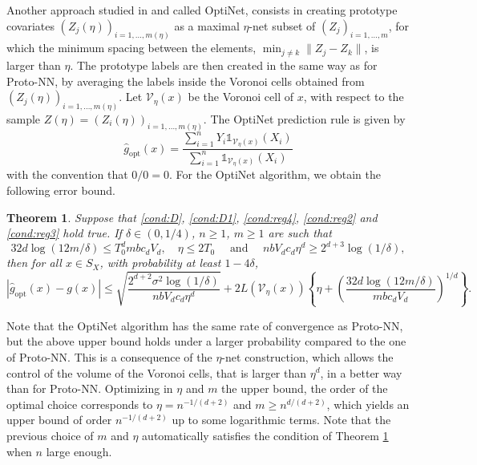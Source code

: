 \documentclass[paper=a4, fontsize=11pt]{scrartcl}
\newcommand{\ind}{\mathds{1}}
\newtheorem{theorem}{Theorem}
\begin{document}
Another approach studied in \cite{NIPS2017_934815ad,hanneke2021universal} and called OptiNet, consists in creating  prototype covariates $(Z_j(\eta))_{i=1,\ldots, m(\eta)} $ as a maximal $\eta$-net  subset of $(Z_j)_{i=1,\ldots, m}$, for which the minimum spacing between the elements, $\min_{j\neq k} \|Z_j- Z_k\|$, is larger than $\eta$. The prototype labels are then created in the same way as for Proto-NN, by averaging the labels inside the Voronoi cells obtained from $(Z_j(\eta))_{i=1,\ldots, m(\eta)} $. Let $\mathcal V_\eta (x) $ be the Voronoi cell of $x$, with respect to the sample $Z(\eta)=(Z_i(\eta))_{i=1,\dots,m(\eta)} $. The OptiNet prediction rule is given by $$ \hat g _{\textrm{opt}}(x) = \frac{\sum_{i=1} ^n Y_i  \ind_{ \mathcal  V_\eta(x) } (X_i )  }{\sum_{i=1} ^n    \ind_{\mathcal  V_\eta(x) } (X_i)  }$$ with the convention that $0/0 = 0$. For the OptiNet algorithm, we obtain the following error bound.

\begin{theorem}\label{th:main_th_OptiNet}
    Suppose that \ref{cond:D}, \ref{cond:D1},  \ref{cond:reg4}, \ref{cond:reg2} and \ref{cond:reg3} hold true. If $\delta \in (0,1/4)$, $n \geq 1$, $m \geq 1$ are such that 
    \begin{equation*}
     32d\log(12m/\delta) \leq  T_0^d  m b c_d V_d, \quad \eta \leq 2T_0 \quad \text{ and } \quad n b V_d c_d \eta^d \geq 2^{d+3} \log(1/\delta), 
    \end{equation*}
then for all $x \in S_X$, with probability at least $1-4\delta$,
        $$|\hat g_{\textrm{opt}} (x) - g(x) | \leq\sqrt{\dfrac{2^{d+2} \sigma^2 \log(1/\delta)}{n b V_d c_d \eta^d} }+ 2 L(\mathcal{V}_\eta(x)) \left\{  \eta +  \left(\dfrac{32d \log(12m/\delta)}{mb c_d V_d} \right)^{1/d} \right\}.$$
\end{theorem}

Note that the OptiNet algorithm has the same rate of convergence as Proto-NN, but the above upper bound holds under a larger probability compared to the one of Proto-NN. This is a consequence of the $\eta$-net construction, which allows the control of the volume of the Voronoi cells, that is larger than $\eta^d$, in a better way than for Proto-NN. %
Optimizing in $\eta$ and $m$ the upper bound, the order of the optimal choice corresponds to $\eta = n^{-1/(d+2)}$ and $m \geq  n^{d/(d+2)}$, which yields an upper bound of order $n^{-1/(d+2)}$ up to some logarithmic terms.
Note that the previous choice of $m $ and $\eta$ automatically satisfies the condition of Theorem \ref{th:main_th_OptiNet} when $n$ large enough. 
\end{document}
